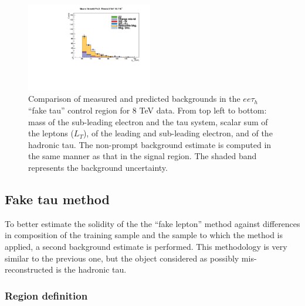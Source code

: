 \begin{figure}
\begin{center}
  \includegraphics[width=0.49\textwidth]{4_Analisys/pics/8TeV/plots/eet/f3/Full/final-f3-tPt-Full.pdf}
  \caption{Comparison of measured and predicted backgrounds in the $ee\tau_h$ ``fake tau'' control region for 8 TeV data.
  From top left to bottom: mass of the sub-leading electron and the tau system, scalar sum of the leptons \pT ($L_T$), \pT of the leading and sub-leading electron, and \pT of the hadronic tau.
  The non-prompt background estimate is computed in the same manner as that in the signal region.
  The shaded band represents the background uncertainty.
  }
  \label{fig:LLT_eet_f3_control_8TeV}
\end{center}
\end{figure}

\subsection{Fake tau method}

To better estimate the solidity of the the ``fake lepton'' method against differences in composition of the training sample and the sample to which the method is applied, a second background estimate is performed.
This methodology is very similar to the previous one, but the object considered as possibly mis-reconstructed is the hadronic tau.

\subsubsection{Region definition}

